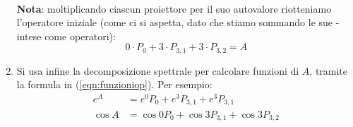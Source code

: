 \documentclass[../../FisicaTeorica.tex]{subfiles}
\begin{document}
\begin{enumerate}
\begin{align*}
	\end{align*}
\textbf{Nota}: moltiplicando ciascun proiettore per il suo autovalore riotteniamo l'operatore iniziale (come ci si aspetta, dato che stiamo sommando le sue  - intese come operatori):
\[
0\cdot P_0+3\cdot P_{3,1}+3\cdot P_{3,2}=A
\]
\item Si usa infine la decomposizione spettrale per calcolare funzioni di $A$, tramite la formula in (\ref{eqn:funzioniop}). Per esempio:
\begin{align*}
    e^A&=e^0P_0+e^3P_{3,1}+e^3P_{3,1}\\
    \cos A &= \cos 0 P_0 + \cos 3 P_{3,1} + \cos 3 P_{3,2}
\end{align*}
\end{enumerate}
\end{document}
